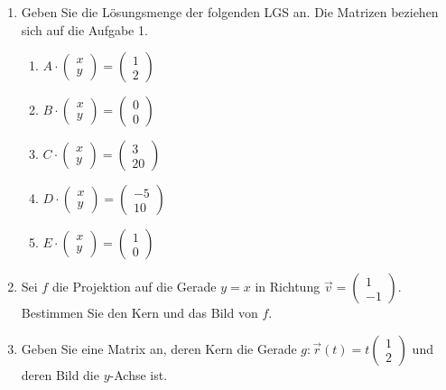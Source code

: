 \begin{ueb}
\begin{enumerate}
  \item Geben Sie die Lösungsmenge der folgenden LGS an. Die Matrizen beziehen sich auf die Aufgabe 1.
  \begin{enumerate}
    \item \( A \cdot \begin{pmatrix} x \\ y \end{pmatrix} = \begin{pmatrix} 1 \\ 2 \end{pmatrix} \)
    \item  \( B \cdot \begin{pmatrix} x \\ y \end{pmatrix} = \begin{pmatrix} 0 \\ 0 \end{pmatrix} \)
    \item \( C \cdot \begin{pmatrix} x \\ y \end{pmatrix} = \begin{pmatrix} 3 \\ 20 \end{pmatrix} \)
    \item \( D \cdot \begin{pmatrix} x \\ y \end{pmatrix} = \begin{pmatrix} -5 \\ 10 \end{pmatrix} \)
    \item \( E \cdot \begin{pmatrix} x \\ y \end{pmatrix} = \begin{pmatrix} 1 \\ 0 \end{pmatrix} \)
  \end{enumerate}

  \item Sei \( f \) die Projektion auf die Gerade \( y = x \) in Richtung  
  \( \vec{v} = \begin{pmatrix} 1 \\ -1 \end{pmatrix} \).  
  Bestimmen Sie den Kern und das Bild von \( f \).

  \item Geben Sie eine Matrix an, deren Kern die Gerade  
  \( g \colon \vec{r}(t) = t \begin{pmatrix} 1 \\ 2 \end{pmatrix} \)  
  und deren Bild die \( y \)-Achse ist.


\end{enumerate}
\end{ueb}
